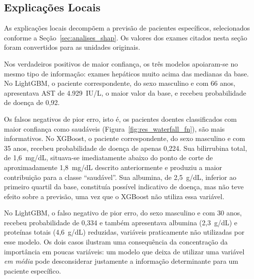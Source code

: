 \subsection{Explicações Locais}
\label{sec:res_shap_local}

As explicações locais decompõem a previsão de pacientes específicos, selecionados conforme a Seção~\ref{sec:analises_shap}. Os valores dos exames citados nesta seção foram convertidos para as unidades originais.

Nos verdadeiros positivos de maior confiança, os três modelos apoiaram-se no mesmo tipo de informação: exames hepáticos muito acima das medianas da base. No LightGBM, o paciente correspondente, do sexo masculino e com 66 anos, apresentava AST de 4.929~IU/L, o maior valor da base, e recebeu probabilidade de doença de 0,92.

Os falsos negativos de pior erro, isto é, os pacientes doentes classificados com maior confiança como saudáveis (Figura~\ref{fig:res_waterfall_fn}), são mais informativos. No XGBoost, o paciente correspondente, do sexo masculino e com 35 anos, recebeu probabilidade de doença de apenas 0,224. Sua bilirrubina total, de 1,6~mg/dL, situava-se imediatamente abaixo do ponto de corte de aproximadamente 1,8~mg/dL descrito anteriormente e produziu a maior contribuição para a classe ``saudável''. Sua albumina, de 2,5~g/dL, inferior ao primeiro quartil da base, constituía possível indicativo de doença, mas não teve efeito sobre a previsão, uma vez que o XGBoost não utiliza essa variável.

No LightGBM, o falso negativo de pior erro, do sexo masculino e com 30 anos, recebeu probabilidade de 0,334 e também apresentava albumina (2,3~g/dL) e proteínas totais (4,6~g/dL) reduzidas, variáveis praticamente não utilizadas por esse modelo. Os dois casos ilustram uma consequência da concentração da importância em poucas variáveis: um modelo que deixa de utilizar uma variável \emph{em média} pode desconsiderar justamente a informação determinante para um paciente específico.

